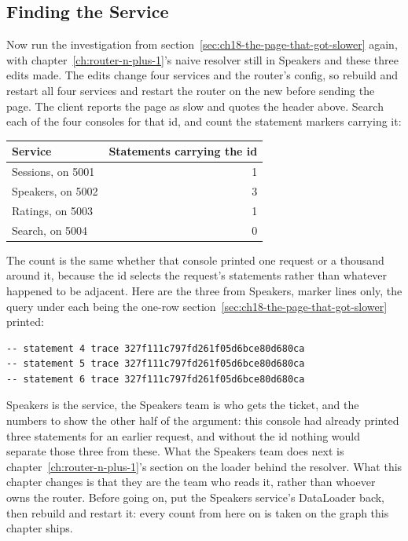 \subsection{Finding the Service}

%
Now run the investigation from
section~\ref{sec:ch18-the-page-that-got-slower} again, with chapter~\ref{ch:router-n-plus-1}'s naive resolver still in
Speakers and these three edits made. The edits change four services and the
router's config, so rebuild and restart all four services and restart the
router on the new  before sending the page. The client reports the page as slow and
quotes the header above. Search each of the four consoles for that id, and
count the statement markers carrying it:

\begin{center}
\begin{tabular}{lr}
\toprule
Service & Statements carrying the id \\
\midrule
Sessions, on 5001 & 1 \\
Speakers, on 5002 & 3 \\
Ratings, on 5003 & 1 \\
Search, on 5004 & 0 \\
\bottomrule
\end{tabular}
\end{center}

%
The count is the same whether that console printed one request or a thousand
around it, because the id selects the request's statements rather than
whatever happened to be adjacent. Here are the three from Speakers, marker
lines only, the query under each being the one-row 
section~\ref{sec:ch18-the-page-that-got-slower} printed:

\begin{verbatim}
-- statement 4 trace 327f111c797fd261f05d6bce80d680ca
-- statement 5 trace 327f111c797fd261f05d6bce80d680ca
-- statement 6 trace 327f111c797fd261f05d6bce80d680ca
\end{verbatim}

%
Speakers is the service, the Speakers team is who gets the ticket, and the
numbers  to  show the other half of the argument: this console
had already printed three statements for an earlier request, and without the
id nothing would separate those three from these. What the Speakers team does
next is chapter~\ref{ch:router-n-plus-1}'s section on the loader behind the
resolver. What this chapter changes is that they are the team who reads it,
rather than whoever owns the router. Before going on, put the Speakers
service's DataLoader back, then rebuild and restart it: every count from here
on is taken on the graph this chapter ships.
%
%

